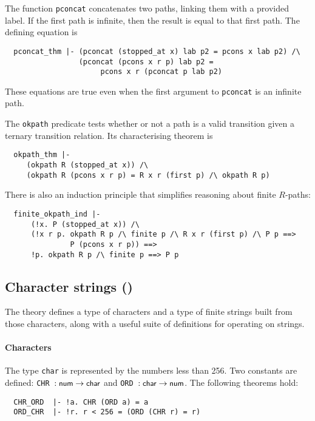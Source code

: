 The function \texttt{pconcat} concatenates two paths, linking them
with a provided label.  If the first path is infinite, then the result
is equal to that first path.  The defining equation is
{\small
\begin{verbatim}
  pconcat_thm |- (pconcat (stopped_at x) lab p2 = pcons x lab p2) /\
                 (pconcat (pcons x r p) lab p2 =
                      pcons x r (pconcat p lab p2)
\end{verbatim}
}
\noindent
These equations are true even when the first argument to
\texttt{pconcat} is an infinite path.

The \texttt{okpath} predicate tests whether or not a path is a valid
transition given a ternary transition relation.  Its characterising
theorem is
{\small
\begin{verbatim}
  okpath_thm |-
     (okpath R (stopped_at x)) /\
     (okpath R (pcons x r p) = R x r (first p) /\ okpath R p)
\end{verbatim}
}

There is also an induction principle that simplifies reasoning about
finite $R$-paths:
{\small
\begin{verbatim}
  finite_okpath_ind |-
      (!x. P (stopped_at x)) /\
      (!x r p. okpath R p /\ finite p /\ R x r (first p) /\ P p ==>
               P (pcons x r p)) ==>
      !p. okpath R p /\ finite p ==> P p
\end{verbatim}
}


\subsection{Character strings ()}

The theory  defines a type of characters and a type
of finite strings built from those characters, along with a useful suite of
definitions for operating on strings.

\paragraph {Characters}

The type \verb+char+ is represented by the numbers less than 256. Two
constants are defined: {\small\verb+CHR +}$: \mbox{\small{\textbf{\sf{num}}}}\to\mbox{\small{\textbf{\sf{char}}}}$ and
{\small\verb+ORD +}$: \mbox{\small{\textbf{\sf{char}}}}\to\mbox{\small{\textbf{\sf{num}}}}$. The following theorems
hold:
{\small
\begin{verbatim}
  CHR_ORD  |- !a. CHR (ORD a) = a
  ORD_CHR  |- !r. r < 256 = (ORD (CHR r) = r)
\end{verbatim}
}


